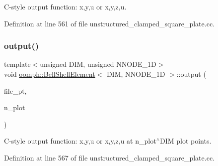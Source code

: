 C-\/style output function\+: x,y,u or x,y,z,u. 



Definition at line 561 of file unstructured\+\_\+clamped\+\_\+square\+\_\+plate.\+cc.

\mbox{\label{classoomph_1_1BellShellElement_a6f203728a7d113a2b1029d18f7bff533}} 
\subsubsection{\texorpdfstring{output()}{output()}\hspace{0.1cm}{\footnotesize\ttfamily [4/4]}}
{\footnotesize\ttfamily template$<$unsigned D\+IM, unsigned N\+N\+O\+D\+E\+\_\+1D$>$ \\
void \hyperlink{classoomph_1_1BellShellElement}{oomph\+::\+Bell\+Shell\+Element}$<$ D\+IM, N\+N\+O\+D\+E\+\_\+1D $>$\+::output (\begin{DoxyParamCaption}\item[{F\+I\+LE $\ast$}]{file\+\_\+pt,  }\item[{const unsigned \&}]{n\+\_\+plot }\end{DoxyParamCaption})\hspace{0.3cm}{\ttfamily [inline]}}



C-\/style output function\+: x,y,u or x,y,z,u at n\+\_\+plot$^\wedge$\+D\+IM plot points. 



Definition at line 567 of file unstructured\+\_\+clamped\+\_\+square\+\_\+plate.\+cc.

\mbox{\label{classoomph_1_1BellShellElement_aaf6d152626e653db12f0d6d3c71b0fef}} 
